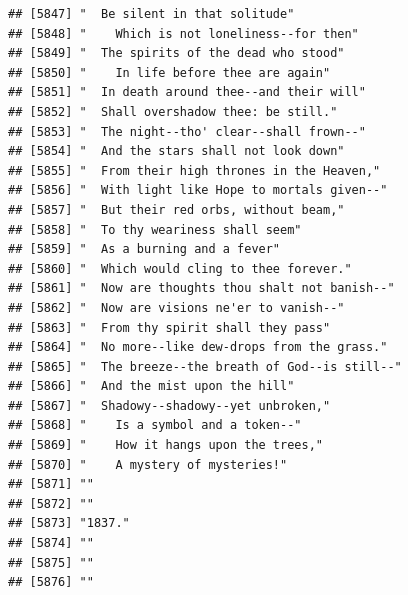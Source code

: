\documentclass{article}\usepackage[]{graphicx}\usepackage[]{color}
\makeatletter
\newenvironment{kframe}{%
 \def\at@end@of@kframe{}%
 \ifinner\ifhmode%
  \def\at@end@of@kframe{\end{minipage}}%
  \begin{minipage}{\columnwidth}%
 \fi\fi%
 \def\FrameCommand##1{\hskip\@totalleftmargin \hskip-\fboxsep
 \colorbox{shadecolor}{##1}\hskip-\fboxsep
     \hskip-\linewidth \hskip-\@totalleftmargin \hskip\columnwidth}%
 \MakeFramed {\advance\hsize-\width
   \@totalleftmargin\z@ \linewidth\hsize
   \@setminipage}}%
 {\par\unskip\endMakeFramed%
 \at@end@of@kframe}
\newenvironment{knitrout}{}{} %
\makeatother
\begin{document}
\begin{knitrout}
\begin{kframe}
\begin{verbatim}
## [5847] "  Be silent in that solitude"                                                
## [5848] "    Which is not loneliness--for then"                                       
## [5849] "  The spirits of the dead who stood"                                         
## [5850] "    In life before thee are again"                                           
## [5851] "  In death around thee--and their will"                                      
## [5852] "  Shall overshadow thee: be still."                                          
## [5853] "  The night--tho' clear--shall frown--"                                      
## [5854] "  And the stars shall not look down"                                         
## [5855] "  From their high thrones in the Heaven,"                                    
## [5856] "  With light like Hope to mortals given--"                                   
## [5857] "  But their red orbs, without beam,"                                         
## [5858] "  To thy weariness shall seem"                                               
## [5859] "  As a burning and a fever"                                                  
## [5860] "  Which would cling to thee forever."                                        
## [5861] "  Now are thoughts thou shalt not banish--"                                  
## [5862] "  Now are visions ne'er to vanish--"                                         
## [5863] "  From thy spirit shall they pass"                                           
## [5864] "  No more--like dew-drops from the grass."                                   
## [5865] "  The breeze--the breath of God--is still--"                                 
## [5866] "  And the mist upon the hill"                                                
## [5867] "  Shadowy--shadowy--yet unbroken,"                                           
## [5868] "    Is a symbol and a token--"                                               
## [5869] "    How it hangs upon the trees,"                                            
## [5870] "    A mystery of mysteries!"                                                 
## [5871] ""                                                                            
## [5872] ""                                                                            
## [5873] "1837."                                                                       
## [5874] ""                                                                            
## [5875] ""                                                                            
## [5876] ""                                                                            

\end{verbatim}
\end{kframe}
\end{knitrout}
\end{document}
